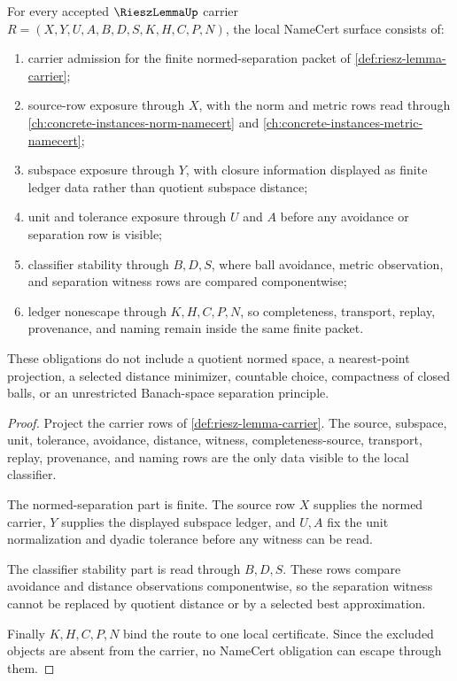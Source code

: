 \begin{theorem}
\label{thm:riesz-lemma-namecert-obligations}
For every accepted $\RieszLemmaUp$ carrier $R=(X,Y,U,A,B,D,S,K,H,C,P,N)$, the local NameCert surface consists of:
\begin{enumerate}
\item carrier admission for the finite normed-separation packet of \autoref{def:riesz-lemma-carrier};
\item source-row exposure through $X$, with the norm and metric rows read through \autoref{ch:concrete-instances-norm-namecert} and \autoref{ch:concrete-instances-metric-namecert};
\item subspace exposure through $Y$, with closure information displayed as finite ledger data rather than quotient subspace distance;
\item unit and tolerance exposure through $U$ and $A$ before any avoidance or separation row is visible;
\item classifier stability through $B,D,S$, where ball avoidance, metric observation, and separation witness rows are compared componentwise;
\item ledger nonescape through $K,H,C,P,N$, so completeness, transport, replay, provenance, and naming remain inside the same finite packet.
\end{enumerate}
These obligations do not include a quotient normed space, a nearest-point projection, a selected distance minimizer, countable choice, compactness of closed balls, or an unrestricted Banach-space separation principle.
\end{theorem}
\begin{proof}
Project the carrier rows of \autoref{def:riesz-lemma-carrier}. The source, subspace, unit, tolerance, avoidance, distance, witness, completeness-source, transport, replay, provenance, and naming rows are the only data visible to the local classifier.

The normed-separation part is finite. The source row $X$ supplies the normed carrier, $Y$ supplies the displayed subspace ledger, and $U,A$ fix the unit normalization and dyadic tolerance before any witness can be read.

The classifier stability part is read through $B,D,S$. These rows compare avoidance and distance observations componentwise, so the separation witness cannot be replaced by quotient distance or by a selected best approximation.

Finally $K,H,C,P,N$ bind the route to one local certificate. Since the excluded objects are absent from the carrier, no NameCert obligation can escape through them.
\end{proof}

